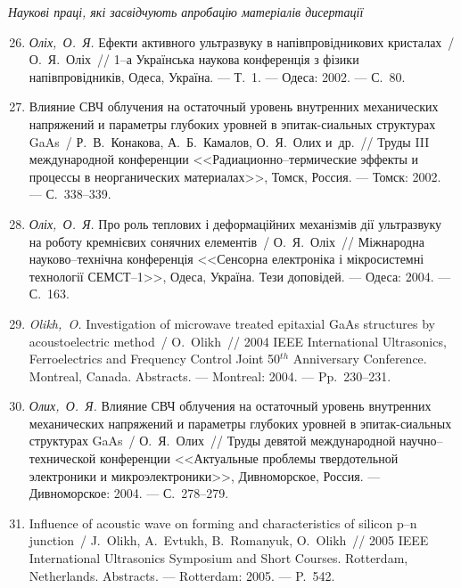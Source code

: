 \begin{center}%
\emph{Наукові праці, які засвідчують апробацію матеріалів дисертації}
\end{center}%
\begin{enumerate}[label=\arabic*.,leftmargin=1em,itemindent=1em]
\setcounter{enumi}{25}
\item
\emph{Оліх,~О.~Я.} Ефекти активного
  ультразвуку в напівпровідникових
  кристалах~/ О.~Я.~Оліх~// 1--а {У}країнська
  наукова конференція з фізики
  напівпровідників, {О}деса, {У}країна. ---
  Т.~1. ---
  Одеса: 2002. ---
  {С.}~80.

\item
Влияние {СВЧ} облучения на остаточный
  уровень внутренних механических
  напряжений и параметры глубоких уровней в
  эпитак-сиальных структурах {G}a{A}s~/
  Р.~В.~Конакова, А.~Б.~Камалов, О.~Я.~Олих
  {и~др.}~// Труды {III} международной
  конференции <<{Р}адиационно--термические
  эффекты и процессы в неорганических
  материалах>>, {Т}омск, {Р}оссия. ---
  Томск: 2002. ---
  {С.}~338--339.

\item
\emph{Оліх,~О.~Я.} Про роль теплових і
  деформаційних механізмів дії ультразвуку
  на роботу кремнієвих сонячних елементів~/
  О.~Я.~Оліх~// Міжнародна науково--технічна
  конференція <<{С}енсорна електроніка і
  мікросистемні технології {СЕМСТ}--1>>,
  {О}деса, {У}країна. Тези доповідей. ---
  Одеса: 2004. ---
  {С.}~163.

\item
\emph{Olikh,~O.} Investigation of microwave treated epitaxial {G}a{A}s
  structures by acoustoelectric method~/ O.~Olikh~// 2004 {IEEE}
  {I}nternational {U}ltrasonics, {F}erroelectrics and {F}requency {C}ontrol
  {J}oint 50$^{th}$ {A}nniversary {C}onference. Montreal, {C}anada. Abstracts.
  ---
  Montreal: 2004. ---
  Pp.~230--231.

\item
\emph{Олих,~О.~Я.} Влияние {СВЧ} облучения на
  остаточный уровень внутренних
  механических напряжений и параметры
  глубоких уровней в эпитак-сиальных
  структурах {G}a{A}s~/ О.~Я.~Олих~// Труды девятой
  международной научно--технической
  конференции <<{А}ктуальные проблемы
  твердотельной электроники и
  микроэлектроники>>, {Д}ивноморское,
  {Р}оссия. ---
  Дивноморское: 2004. ---
  {С.}~278--279.

\item
Influence of acoustic wave on forming and characteristics of silicon p--n
  junction~/ J.~Olikh, A.~Evtukh, B.~Romanyuk, O.~Olikh~// 2005 {IEEE}
  {I}nternational {U}ltrasonics {S}ymposium and {S}hort {C}ourses. Rotterdam,
  {N}etherlands. Abstracts. ---
  Rotterdam: 2005. ---
  P.~542.


\end{enumerate}
